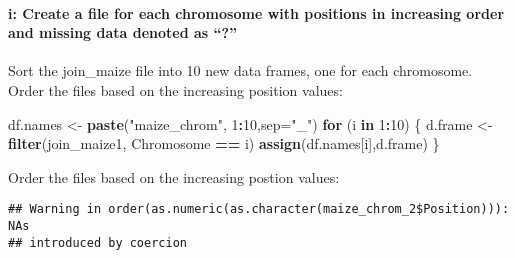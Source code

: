 \documentclass[]{article}
\newenvironment{Shaded}{\begin{snugshade}}{\end{snugshade}}
\newcommand{\ControlFlowTok}[1]{\textcolor[rgb]{0.13,0.29,0.53}{\textbf{#1}}}
\newcommand{\DataTypeTok}[1]{\textcolor[rgb]{0.13,0.29,0.53}{#1}}
\newcommand{\DecValTok}[1]{\textcolor[rgb]{0.00,0.00,0.81}{#1}}
\newcommand{\KeywordTok}[1]{\textcolor[rgb]{0.13,0.29,0.53}{\textbf{#1}}}
\newcommand{\NormalTok}[1]{#1}
\newcommand{\OperatorTok}[1]{\textcolor[rgb]{0.81,0.36,0.00}{\textbf{#1}}}
\newcommand{\StringTok}[1]{\textcolor[rgb]{0.31,0.60,0.02}{#1}}
\let\oldparagraph\paragraph
\renewcommand{\paragraph}[1]{\oldparagraph{#1}\mbox{}}
\begin{document}
\hypertarget{i-create-a-file-for-each-chromosome-with-positions-in-increasing-order-and-missing-data-denoted-as}{%
\paragraph{i: Create a file for each chromosome with positions in
increasing order and missing data denoted as
``?''}\label{i-create-a-file-for-each-chromosome-with-positions-in-increasing-order-and-missing-data-denoted-as}}

Sort the join\_maize file into 10 new data frames, one for each
chromosome. Order the files based on the increasing position values:

\begin{Shaded}
\begin{Highlighting}[]
\NormalTok{df.names <-}\StringTok{ }\KeywordTok{paste}\NormalTok{(}\StringTok{"maize_chrom"}\NormalTok{, }\DecValTok{1}\OperatorTok{:}\DecValTok{10}\NormalTok{,}\DataTypeTok{sep=}\StringTok{"_"}\NormalTok{)}
\ControlFlowTok{for}\NormalTok{ (i }\ControlFlowTok{in} \DecValTok{1}\OperatorTok{:}\DecValTok{10}\NormalTok{) \{}
\NormalTok{  d.frame <-}\StringTok{ }\KeywordTok{filter}\NormalTok{(join_maize1, Chromosome }\OperatorTok{==}\StringTok{ }\NormalTok{i)}
  \KeywordTok{assign}\NormalTok{(df.names[i],d.frame)}
\NormalTok{\}}
\end{Highlighting}
\end{Shaded}

Order the files based on the increasing postion values:

\begin{Shaded}
\end{Shaded}

\begin{verbatim}
## Warning in order(as.numeric(as.character(maize_chrom_2$Position))): NAs
## introduced by coercion
\end{verbatim}
\end{document}
